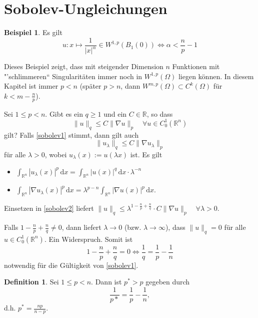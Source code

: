 \documentclass[
paper=a4,
bibtotocnumbered,
liststotocnumbered,
tablecaptionabove,
pointlessnumbers,
twoside,
openright,
10pt
]
{report}
\theoremstyle{definition}
\newtheorem*{df}{Definition}
\newtheorem*{bsp}{Beispiel}
\numberwithin{equation}{chapter}
\begin{document}
\section{Sobolev-Ungleichungen}
\begin{bsp}
	Es gilt
	\begin{equation}
		u: x \mapsto \frac{1}{|x|^\alpha} \in W^{1,p}(B_1(0)) \iff \alpha < \frac{n}{p}-1
	\end{equation}
\end{bsp}
Dieses Beispiel zeigt, dass mit steigender Dimension $n$ Funktionen mit "'schlimmeren`` Singularitäten immer noch in $W^{1,p}(\Omega)$ liegen können. In diesem Kapitel ist immer $p<n$ (später $p>n$, dann $W^{m,p}(\Omega) \subset C^k(\Omega)$ für $k<m-\frac{n}{p}$).

Sei $1\le p <n$. Gibt es ein $q\ge 1$ und ein $C\in \mathbb R$, so dass
\begin{equation}\label{sobolev1}
\| u\|_q \le C \| \nabla u \|_p \quad \forall u\in C_0^1(\mathbb R^n)
\end{equation}
gilt?  Falls \eqref{sobolev1} stimmt, dann gilt auch 
\begin{equation}\label{sobolev2}
\| u_\lambda\|_q \le C \| \nabla u_\lambda\|_p
\end{equation}
für alle $\lambda>0$, wobei $u_\lambda(x):= u(\lambda x)$ ist. Es gilt
\begin{itemize}
\item $\int_{\mathbb R^n} |u_\lambda(x)|^p \, \mathrm dx = \int_{\mathbb R^n} |u(x)|^q \, \mathrm dx \cdot \lambda^{-n}$\\
\item $\int_{\mathbb R^n} |\nabla u_\lambda(x)|^p \, \mathrm dx = \lambda^{p-n} \int_{\mathbb R^n} |\nabla u(x)|^p \, \mathrm dx$.
\end{itemize}
Einsetzen in \eqref{sobolev2} liefert $\| u\|_q \le \lambda^{1-\frac{n}{p} + \frac{n}{q}} \cdot C \| \nabla u \|_p \quad \forall \lambda>0$.

Falls $1-\frac{n}{p} + \frac{n}{q} \neq 0$, dann liefert $\lambda \to 0$ (bzw. $\lambda \to \infty$), dass $\| u\|_q=0$ für alle $u\in C_0^1(\mathbb R^n)$. Ein Widerspruch. Somit ist
\begin{equation}
	1- \frac{n}{p} + \frac{n}{q}=0 \iff \frac{1}{q}=\frac{1}{p} - \frac{1}{n}
\end{equation}
notwendig für die Gültigkeit von \eqref{sobolev1}. 
\begin{df}
Sei $1\le p <n$. Dann ist $p^* >p$ gegeben durch
\begin{equation}
	\frac{1}{p*}= \frac{1}{p} - \frac{1}{n},
\end{equation}
d.h. $p^* = \frac{np}{n-p}$.
\end{df}
\end{document}

